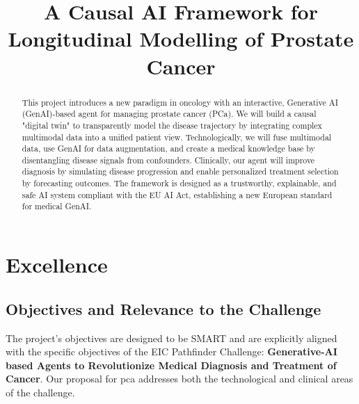 \documentclass[11pt, a4paper]{article}
\title{A Causal AI Framework for Longitudinal Modelling of Prostate Cancer}
\author{}
\date{}
\begin{document}
\maketitle

\begin{abstract}
This project introduces a new paradigm in oncology with an interactive, Generative AI (GenAI)-based agent for managing prostate cancer (PCa). We will build a causal "digital twin" to transparently model the disease trajectory by integrating complex multimodal data into a unified patient view. Technologically, we will fuse multimodal data, use GenAI for data augmentation, and create a medical knowledge base by disentangling disease signals from confounders. Clinically, our agent will improve diagnosis by simulating disease progression and enable personalized treatment selection by forecasting outcomes. The framework is designed as a trustworthy, explainable, and safe AI system compliant with the EU AI Act, establishing a new European standard for medical GenAI.
\end{abstract}

\section{Excellence}

\subsection{Objectives and Relevance to the Challenge}
The project's objectives are designed to be SMART and are explicitly aligned with the specific objectives of the EIC Pathfinder Challenge: \textbf{Generative-AI based Agents to Revolutionize Medical Diagnosis and Treatment of Cancer}. Our proposal for \gls{pca} addresses both the technological and clinical areas of the challenge.
\end{document}
